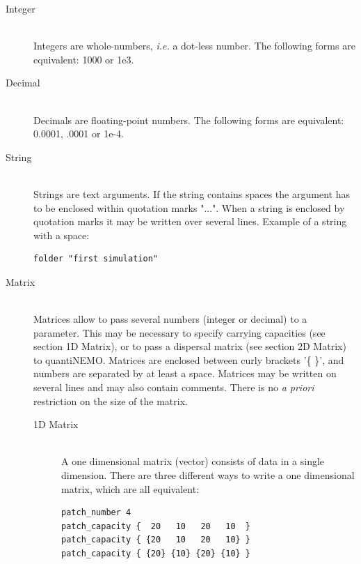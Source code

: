 \documentclass[letterpaper,12pt,oneside]{book}
\begin{document}
\begin{description}
\item[Integer]\hspace*{\fill}\\
Integers are whole-numbers, \textit{i.e.} a dot-less number. The following forms are equivalent: 1000 or 1e3.

\item[Decimal]\hspace*{\fill}\\
Decimals are floating-point numbers. The following forms are equivalent: 0.0001, .0001 or 1e-4.

\item[String]\hspace*{\fill}\\
Strings are text arguments. If the string contains spaces the argument has to be enclosed within quotation marks "...". When a string is enclosed by quotation marks it may be written over several lines. Example of a string with a space:
\begin{lstlisting}[frame=single]
folder "first simulation"
\end{lstlisting}

\item[\label{matparam}Matrix]\hspace*{\fill}\\
Matrices allow to pass several numbers (integer or decimal) to a parameter. This may be necessary to specify carrying capacities (see section 1D Matrix), or to pass a dispersal matrix (see section 2D Matrix) to quantiNEMO. Matrices are enclosed between curly brackets '\{ \}', and numbers are separated by at least a space. Matrices may be written on several lines and may also contain comments. There is no \textit{a priori} restriction on the size of the matrix. 

\begin{description}
\item[1D Matrix]\hspace*{\fill}\\
A one dimensional matrix (vector) consists of data in a single dimension. There are three different ways to write a one dimensional matrix, which are all equivalent:
\begin{lstlisting}[frame=single]
patch_number 4
patch_capacity {  20   10   20   10  }
patch_capacity { {20   10   20   10} }
patch_capacity { {20} {10} {20} {10} }
\end{lstlisting}


\end{description}
\end{description}
\end{document}
